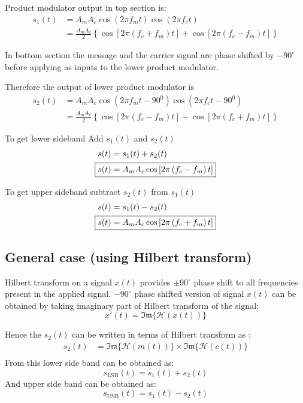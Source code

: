 Product modulator output in top section is:
\begin{align*}
	s_1\left ( t \right )&=A_mA_c \cos \left ( 2 \pi f_mt \right ) \cos\left ( 2 \pi f_ct \right ) \\
	&=\frac{A_mA_c}{2} \left \{ \cos \left [ 2 \pi\left ( f_c+f_m \right )t \right ]+ \cos\left [ 2 \pi\left ( f_c-f_m \right )t \right ] \right \}
\end{align*}

In bottom section the message and the carrier signal are phase shifted by $-90^\circ$ before applying as inputs to the lower product modulator.

Therefore the output of lower product modulator is
\begin{align*}
	s_2\left ( t \right ) &=A_mA_c \cos\left ( 2 \pi f_mt-90^0 \right ) \cos\left (2 \pi f_ct-90^0  \right ) \\
	 &=\frac{A_mA_c}{2} \left \{ \cos \left [ 2 \pi\left ( f_c-f_m \right )t \right ]- \cos\left [ 2 \pi\left ( f_c+f_m \right )t \right ] \right \}
\end{align*}

To get lower sideband Add $s_1(t)$ and $s_2(t)$
\begin{align*}
	s(t) &= s_1(t) + s_2(t) \\
	\Aboxed{s(t)&=A_mA_c \cos \left [ 2 \pi\left ( f_c-f_m \right )t \right ]}
\end{align*}

To get upper sideband subtract $s_2(t)$ from $s_1(t)$
\begin{align*}
	s(t) &= s_1(t) - s_2(t) \\
	\Aboxed{s(t) &=A_mA_c \cos \left [ 2 \pi\left ( f_c+f_m \right )t \right ]}
\end{align*}

\subsection{General case (using Hilbert transform)}
Hilbert transform on a signal $x(t)$ provides $\pm 90^\circ$ phase shift to all frequencies present in the applied signal.
$-90^\circ$ phase shifted version of signal $x(t)$ can be obtained by taking imaginary part of Hilbert transform of the signal:
$$x'(t) = \mathfrak{Im}\{\mathcal{H}(x(t))\}$$

Hence the $s_2(t)$ can be written in terms of Hilbert transform as :
\begin{align*}
	s_2(t) &= \mathfrak{Im}\{\mathcal{H}(m(t))\}\times \mathfrak{Im}\{\mathcal{H}(c(t))\} \\
\end{align*}
From this lower side band can be obtained as:
$$s_{\text{LSB}}(t) = s_1(t) + s_2(t)$$
And upper side band can be obtained as:
$$s_{\text{USB}}(t) = s_1(t) - s_2(t)$$

